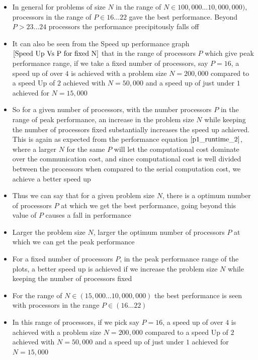 \documentclass[twoside,11pt]{article}\usepackage{amsmath,amsfonts,amsthm,fullpage}
\begin{document}
\begin{itemize}
\item
In general for problems of size $N$ in the range of $N \in 100,000 \dots 10,000,000)$,  processors in the range of $P \in 16 \dots 22$ gave the best performance. Beyond $P > 23 \dots 24$ processors the performance precipitously falls off
\item
It can also be seen from the Speed up performance graph $\ref{Speed Up Vs P for fixed N}$ that in the range of processors $P$ which give peak performance range, if we take a fixed number of processors, say $P=16$, a speed up of over $4$ is achieved with a problem size $N=200,000$ compared to a speed Up of $2$ achieved with $N=50,000$ and a speed up of just under $1$ achieved for $N=15,000$
\item
So for a given number of processors, with the number processors $P$ in the range of peak performance, an increase in the problem size $N$ while keeping the number of processors fixed substantially increases the speed up achieved. This is again as expected from the performance equation $\eqref{p1_runtime_2}$, where a larger $N$ for the same $P$ will let the computational cost dominate over the communication cost, and since computational cost is well divided between the processors when compared to the serial computation cost, we achieve a better speed up
\item
Thus we can say that for a given problem size $N$, there is a optimum number of processors $P$ at which we get the best performance, going beyond this value of $P$ causes a fall in performance
\item
Larger the problem size $N$, larger the optimum number of processors $P$ at which we can get the peak performance
\item
For a fixed number of processors $P$, in the peak performance range of the plots, a better speed up is achieved if we increase the problem size $N$ while keeping the number of processors fixed
\item
For the range of $N \in (15,000\dots 10,000,000)$ the best performance is seen with processors in the range $P \in (16\dots 22)$
\item
In this range of processors, if we pick say $P=16$, a speed up of over $4$ is achieved with a problem size $N=200,000$ compared to a speed Up of $2$ achieved with $N=50,000$ and a speed up of just under $1$ achieved for $N=15,000$
\end{itemize}




\end{document}
